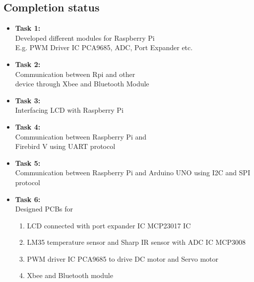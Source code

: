 \documentclass[a4paper,12pt,oneside]{book}
\begin{document}
\subsection*{Completion status}
\begin{itemize}
    \item \textbf{Task 1:}  \\ 
            Developed different modules for Raspberry Pi \\
            E.g. PWM Driver IC PCA9685, ADC, Port Expander etc. \\
    \item \textbf{Task 2:} \\
            Communication between Rpi and other \\
            device through Xbee and Bluetooth Module \\
    \item \textbf{Task 3:} \\
            Interfacing LCD with Raspberry Pi  \\
    \item \textbf{Task 4:}  \\
            Communication between Raspberry Pi and \\
            Firebird V using UART protocol    \\
    \item \textbf{Task 5:}  \\
            Communication between Raspberry Pi  
            and Arduino UNO       
            using I2C and SPI protocol     \\
    \item \textbf{Task 6:} \\
            Designed PCBs for \\
            \begin{enumerate}
            \item LCD connected with port expander IC MCP23017 IC
            \item LM35 temperature sensor and Sharp IR sensor with ADC IC MCP3008
            \item PWM driver IC PCA9685 to drive DC motor and Servo motor 
            \item Xbee and Bluetooth module 
            \end{enumerate}
              
\end{itemize}
    
\end{document}
